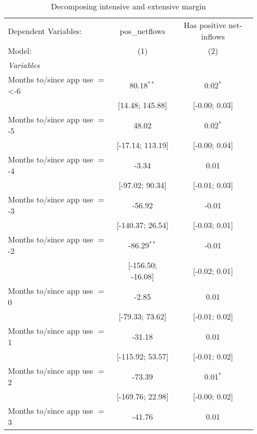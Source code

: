 
\begin{table}[htbp]
   \centering
   \tiny
   \begin{threeparttable}[b]
      \caption{\label{tab:reg_decomp_intext} Decomposing intensive and extensive margin}
      \begin{tabular}{lcc}
         \tabularnewline \midrule \midrule
         Dependent Variables:            & pos\_netflows     & Has positive net-inflows\\  
         Model:                          & (1)               & (2)\\  
         \midrule
         \emph{Variables}\\
         Months to/since app use $=$ <-6 & 80.18$^{**}$      & 0.02$^{*}$\\   
                                         & [14.48; 145.88]   & [-0.00; 0.03]\\   
         Months to/since app use $=$ -5  & 48.02             & 0.02$^{*}$\\   
                                         & [-17.14; 113.19]  & [-0.00; 0.04]\\   
         Months to/since app use $=$ -4  & -3.34             & 0.01\\   
                                         & [-97.02; 90.34]   & [-0.01; 0.03]\\   
         Months to/since app use $=$ -3  & -56.92            & -0.01\\   
                                         & [-140.37; 26.54]  & [-0.03; 0.01]\\   
         Months to/since app use $=$ -2  & -86.29$^{**}$     & -0.01\\   
                                         & [-156.50; -16.08] & [-0.02; 0.01]\\   
         Months to/since app use $=$ 0   & -2.85             & 0.01\\   
                                         & [-79.33; 73.62]   & [-0.01; 0.02]\\   
         Months to/since app use $=$ 1   & -31.18            & 0.01\\   
                                         & [-115.92; 53.57]  & [-0.01; 0.02]\\   
         Months to/since app use $=$ 2   & -73.39            & 0.01$^{*}$\\   
                                         & [-169.76; 22.98]  & [-0.00; 0.02]\\   
         Months to/since app use $=$ 3   & -41.76            & 0.01\\   

\end{tabular}
\end{threeparttable}
\end{table}
